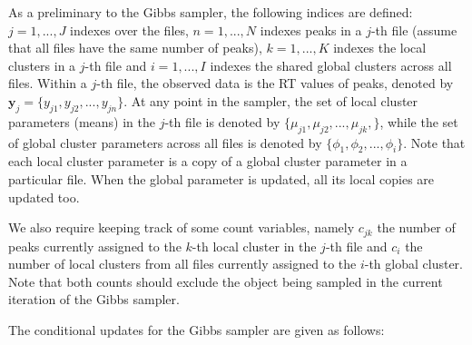 As a preliminary to the Gibbs sampler, the following indices are defined: $j=1,...,J$ indexes over the files, $n=1,...,N$ indexes peaks in a $j$-th file (assume that all files have the same number of peaks), $k=1,...,K$ indexes the local clusters in a $j$-th file and $i=1,...,I$ indexes the shared global clusters across all files. Within a $j$-th file, the observed data is the RT values of peaks, denoted by $\boldsymbol{y}_j=\{y_{j1}, y_{j2}, ..., y_{jn}\}$. At any point in the sampler, the set of local cluster parameters (means) in the $j$-th file is denoted by $\{\mu_{j1}, \mu_{j2}, ..., \mu_{jk},\}$, while the set of global cluster parameters across all files is denoted by $\{\phi_1, \phi_2, ..., \phi_i\}$. Note that each local cluster parameter is a copy of a global cluster parameter in a particular file. When the global parameter is updated, all its local copies are updated too.

We also require keeping track of some count variables, namely $c_{jk}$ the number of peaks currently assigned to the $k$-th local cluster in the $j$-th file and $c_{i}$ the number of local clusters from all files currently assigned to the $i$-th global cluster. Note that both counts should exclude the object being sampled in the current iteration of the Gibbs sampler.

The conditional updates for the Gibbs sampler are given as follows:


